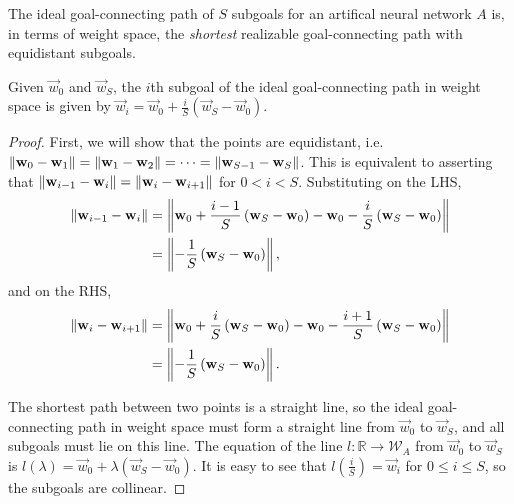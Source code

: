 \begin{definition}
    \label{def:ideal_goal_connecting_path}
    The ideal goal-connecting path of $S$ subgoals for an artifical neural network $A$ is, in terms of weight space, the \textit{shortest} realizable goal-connecting path with equidistant subgoals. 
\end{definition}

\begin{lemma}
    \label{lmm:ideal_subgoal_construction}
    Given $\vec{w}_0$ and $\vec{w}_S$, the $i$th subgoal of the ideal goal-connecting path in weight space is given by
    $
        \vec{w}_i = \vec{w}_0 + \frac{i}{S}\left( \vec{w}_S - \vec{w}_0 \right)
    $.
\end{lemma}
\begin{proof}
    First, we will show that the points are equidistant, i.e. $\left\lVert\mathbf{w}_0 - \mathbf{w}_1\right\rVert = \left\lVert\mathbf{w}_1 - \mathbf{w}_2\right\rVert = \dots = \left\lVert\mathbf{w}_{S-1} - \mathbf{w}_S\right\rVert$.
    This is equivalent to asserting that $\left\lVert\mathbf{w}_{i-1} - \mathbf{w}_i\right\rVert = \left\lVert\mathbf{w}_i - \mathbf{w}_{i+1}\right\rVert$ for $0 < i < S$.
    Substituting on the LHS,
    \begin{align*}
        \left\lVert\mathbf{w}_{i-1} - \mathbf{w}_i\right\rVert
        &= \left\lVert\mathbf{w}_0 + \frac{i-1}{S}\left( \mathbf{w}_S - \mathbf{w}_0 \right) - \mathbf{w}_0 - \frac{i}{S}\left( \mathbf{w}_S - \mathbf{w}_0 \right)\right\rVert \\
        &= \left\lVert-\frac{1}{S}\left(\mathbf{w}_S - \mathbf{w}_0 \right)\right\rVert,
    \end{align*}
    and on the RHS,
    \begin{align*}
        \left\lVert\mathbf{w}_i - \mathbf{w}_{i+1}\right\rVert
        &= \left\lVert\mathbf{w}_0 + \frac{i}{S}\left( \mathbf{w}_S - \mathbf{w}_0 \right) - \mathbf{w}_0 - \frac{i+1}{S}\left( \mathbf{w}_S - \mathbf{w}_0 \right)\right\rVert \\
        &= \left\lVert-\frac{1}{S}\left(\mathbf{w}_S - \mathbf{w}_0 \right)\right\rVert.
    \end{align*}

    The shortest path between two points is a straight line, so the ideal goal-connecting path in weight space must form a straight line from $\vec{w}_0$ to $\vec{w}_S$, and all subgoals must lie on this line.
    The equation of the line $l:\mathbb{R} \rightarrow \mathcal{W}_A$ from $\vec{w}_0$ to $\vec{w}_S$ is $l(\lambda) = \vec{w}_0 + \lambda\left( \vec{w}_S - \vec{w}_0 \right)$.
    It is easy to see that $l\left(\frac{i}{S}\right)=\vec{w}_i$ for $0 \leq i \leq S$, so the subgoals are collinear.
\end{proof}

